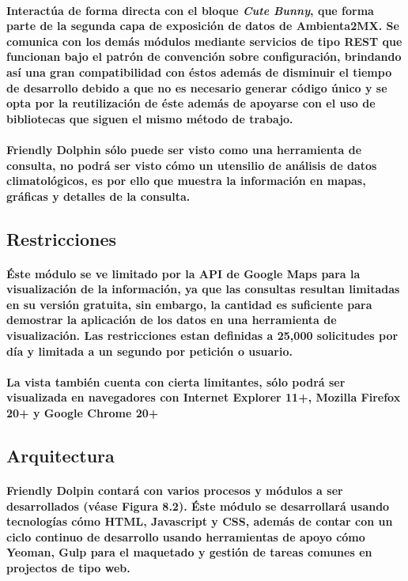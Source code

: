     \paragraph{Interactúa de forma directa con el bloque \textbf{\emph{Cute Bunny}}, que forma parte de la segunda capa de exposición de datos de Ambienta2MX. Se comunica con los demás módulos mediante servicios de tipo REST que funcionan bajo el patrón de convención sobre configuración\cite{8}, brindando así una gran compatibilidad con éstos además de disminuir el tiempo de desarrollo debido a que no es necesario generar código único y se opta por la reutilización de éste además de apoyarse con el uso de bibliotecas que siguen el mismo método de trabajo.}
    \paragraph{Friendly Dolphin sólo puede ser visto como una herramienta de consulta, no podrá ser visto cómo un utensilio de análisis de datos climatológicos, es por ello que muestra la información en mapas, gráficas y detalles de la consulta.}
  \subsection{Restricciones}
    \paragraph{Éste módulo se ve limitado por la API de Google Maps para la visualización de la información, ya que las consultas resultan limitadas en su versión gratuita, sin embargo, la cantidad es suficiente para demostrar la aplicación de los datos en una herramienta de visualización. Las restricciones estan definidas a 25,000 solicitudes por día y limitada a un segundo por petición o usuario.}
    \paragraph{La vista también cuenta con cierta limitantes, sólo podrá ser visualizada en navegadores con Internet Explorer 11+, Mozilla Firefox 20+ y Google Chrome 20+}
  \subsection{Arquitectura}
    \paragraph{Friendly Dolpin contará con varios procesos y módulos a ser desarrollados (véase Figura 8.2). Éste módulo se desarrollará usando tecnologías cómo HTML, Javascript y CSS, además de contar con un ciclo continuo de desarrollo usando herramientas de apoyo cómo Yeoman, Gulp para el maquetado y gestión de tareas comunes en projectos de tipo web.}

